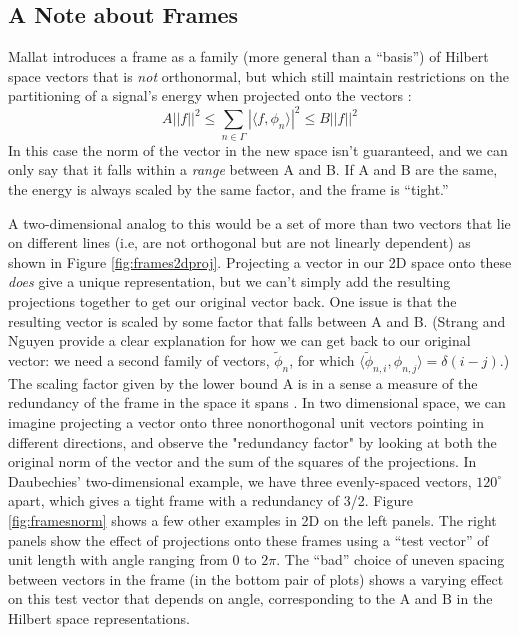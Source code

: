\documentclass[letterpaper]{article}
\begin{document}
\subsection{A Note about Frames}
\label{sec:frames}

Mallat introduces a frame as a family (more general than a ``basis'') of Hilbert space vectors that is \emph{not} orthonormal,
but which still maintain restrictions on the partitioning of a signal's energy when projected onto the vectors \cite[p.~126]{mallat}:
\[ A||f||^2 \leq \sum_{n \in \Gamma} |\langle f, \phi_n\rangle|^2  \leq B||f||^2 \]
In this case the norm of the vector in the new space isn't guaranteed, and we can only say that it falls within a \emph{range} between A and B.
If A and B are the same, the energy is always scaled by the same factor, and the frame is ``tight.''

A two-dimensional analog to this would be a set of more than two vectors that lie on different lines
(i.e, are not orthogonal but are not linearly dependent) as shown in Figure \ref{fig:frames2dproj}.
Projecting a vector in our 2D space onto these \emph{does} give a unique representation,
but we can't simply add the resulting projections together to get our original vector back.
One issue is that the resulting vector is scaled by some factor that falls between A and B.
(Strang and Nguyen provide a clear explanation for how we can get back to our original vector:
we need a second family of vectors, \( \tilde{\phi}_{n} \), for which \( \langle \tilde{\phi}_{n,i}, \phi_{n,j} \rangle = \delta(i-j) \).)
The scaling factor given by the lower bound A is in a sense a measure of the redundancy of the frame in the space it spans \cite[p.~57]{daub}.
In two dimensional space, we can imagine projecting a vector onto three nonorthogonal unit vectors pointing in different directions,
and observe the "redundancy factor" by looking at both the original norm of the vector and the sum of the squares of the projections.
In Daubechies' two-dimensional example, we have three evenly-spaced vectors,
\( 120^{\circ} \) apart, which gives a tight frame with a redundancy of 3/2.
Figure \ref{fig:framesnorm} shows a few other examples in 2D on the left panels.
The right panels show the effect of projections onto these frames using a ``test vector''
of unit length with angle ranging from 0 to \(2\pi\).
The ``bad'' choice of uneven spacing between vectors in the frame (in the bottom pair of plots)
shows a varying effect on this test vector that depends on angle, corresponding to the A and B in the Hilbert space representations.
\end{document}

